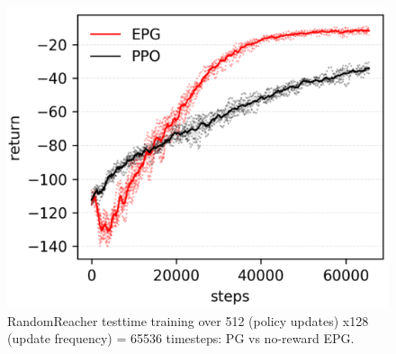 \begin{figure}[H]
	\includegraphics[scale=0.5]{reacher.png}
	\centering
	\caption{RandomReacher testtime training over 512 (policy updates) x128 (update frequency) = 65536 timesteps: PG vs no-reward EPG.}
	\label{reacher}
\end{figure}